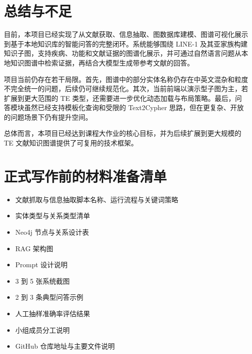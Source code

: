 \section{总结与不足}

目前，本项目已经实现了从文献获取、信息抽取、图数据库建模、图谱可视化展示到基于本地知识库的智能问答的完整闭环。系统能够围绕 LINE-1 及其亚家族构建知识子图，支持疾病、功能和文献证据的图谱化展示，并可通过自然语言问题从本地知识图谱中检索证据，再结合大模型生成带参考文献的回答。

项目当前仍存在若干局限。首先，图谱中的部分实体名称仍存在中英文混杂和粒度不完全统一的问题，后续仍可继续规范化。其次，当前前端以演示型子图为主，若扩展到更大范围的 TE 类型，还需要进一步优化动态加载与布局策略。最后，问答模块虽然已经支持模板化查询和受限的 Text2Cypher 思路，但在更复杂、开放的问题场景下仍有提升空间。

总体而言，本项目已经达到课程大作业的核心目标，并为后续扩展到更大规模的 TE 文献知识图谱提供了可复用的技术框架。

\section*{正式写作前的材料准备清单}
\begin{itemize}[leftmargin=2em]
  \item 文献抓取与信息抽取脚本名称、运行流程与关键词策略
  \item 实体类型与关系类型清单
  \item Neo4j 节点与关系设计表
  \item RAG 架构图
  \item Prompt 设计说明
  \item 3 到 5 张系统截图
  \item 2 到 3 条典型问答示例
  \item 人工抽样准确率评估结果
  \item 小组成员分工说明
  \item GitHub 仓库地址与主要文件说明
\end{itemize}
